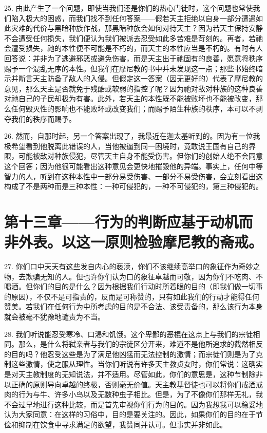 25. 由此产生了一个问题，即使当我们还是你们的热心门徒时，这个问题也常使我们陷入极大的困惑，而我们找不到任何答案——假若天主拒绝以自身一部分遭遇如此灾难的代价与黑暗种族作战，那黑暗种族会如何对待天主？因为若天主保持安静不会遭受任何损失，我们便认为我们被派去忍受如此多苦难是苛刻的。再者，若祂会遭受损失，祂的本性便不可能是不朽的，而天主的本性应当是不朽的。有时有人回答说：并非为了逃避邪恶或避免伤害，而是天主出于祂固有的良善，愿意将秩序赐予一个混乱无序的本性。但我们在摩尼教的书中并未发现这一点；那些书始终暗示并断言天主防备了敌人的入侵。但假定这一答案（因无更好的）代表了摩尼教的意见，那么天主是否就免于残酷或软弱的指控了呢？因为祂对敌对种族的这种良善对祂自己的子民却极为有害。此外，若天主的本性既不能被败坏也不能被改变，那么任何毁灭性的影响也不能败坏或改变我们；而赐予陌生种族的秩序，本可以不剥夺我们的秩序而赐予。\par

26. 然而，自那时起，另一个答案出现了，我最近在迦太基听到的。因为有一位我极希望看到他脱离此错误的人，当他被逼到同一困境时，竟敢说王国有自己的界限，可能被敌对种族侵犯，尽管天主自身不能受伤害。但你们的创始人绝不会同意这个回答；因为他很可能看出这种意见会更快地摧毁他的异端。事实上，任何中等智力的人，听到在这种本性中一部分易受伤害、一部分不易受伤害，会立刻看出这构成了不是两种而是三种本性：一种可侵犯的，一种不可侵犯的，第三种侵犯的。\par


\section{第十三章——行为的判断应基于动机而非外表。以这一原则检验摩尼教的斋戒。}

27. 你们口中天天有这些发自内心的亵渎，你们不该继续高举口的象征作为奇妙之物，去欺骗无知的人。但也许你们认为口的象征卓越而可敬，因为你们不吃肉、不喝酒。但你们的目的是什么？因为根据我们行动时所着眼的目的（即我们做一切事的原因），不仅不是可指责的，反而是可称赞的，只有如此我们的行动才能得任何赞美。若我们在任何行为中所考虑的目的是不合法、该受责备的，那么该行为本身就会被毫不犹豫地谴责为不当。\par

28. 我们听说能忍受寒冷、口渴和饥饿。这个卑鄙的恶棍在这点上与我们的宗徒相同。那么，是什么将弑亲者与我们的宗徒区分开来，难道不是他所追求的截然相反的目的吗？他忍受这些是为了满足他凶猛而无法控制的激情；而宗徒们则是为了克制这些激情，使之服从理性。当你们听说有许多天主教贞女时，你们常说：这确实是对天主教制度的无知说法，并不适用。尽管如此，你们的意思是，这种节制除非以正确的原则导向卓越的终极，否则毫无价值。天主教基督徒也可以将你们戒酒戒肉的行为与牛、许多小鸟以及无数种虫子相比。但是，为了不像你们那样无礼，我不会过早地进行这种比较，而是首先审视你们行为的目的。因为我想我可以稳妥地认为大家同意：在这样的习俗中，目的是要关注的。因此，如果你们的目的在于节俭和抑制在饮食中寻求满足的欲望，我赞同并认可。但事实并非如此。\par

